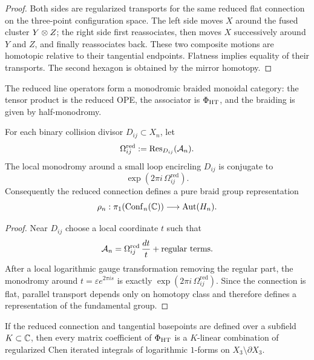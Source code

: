 \begin{proof}
Both sides are regularized transports for the same reduced flat connection on the three-point configuration space. The left side moves $X$ around the fused cluster $Y\otimes Z$; the right side first reassociates, then moves $X$ successively around $Y$ and $Z$, and finally reassociates back. These two composite motions are homotopic relative to their tangential endpoints. Flatness implies equality of their transports. The second hexagon is obtained by the mirror homotopy.
\end{proof}

\begin{corollary}\label{cor:braided-category}
The reduced line operators form a monodromic braided monoidal category: the tensor product is the reduced OPE, the associator is $\Phi_{\mathrm{HT}}$, and the braiding is given by half-monodromy.
\end{corollary}

\begin{theorem}\label{thm:pure-braid}
For each binary collision divisor $D_{ij}\subset X_n$, let
\[
 \Omega_{ij}^{\mathrm{red}}:=\mathrm{Res}_{D_{ij}}(\mathcal A_n).
\]
The local monodromy around a small loop encircling $D_{ij}$ is conjugate to
\[
 \exp(2\pi i\,\Omega_{ij}^{\mathrm{red}}).
\]
Consequently the reduced connection defines a pure braid group representation
\[
 \rho_n: \pi_1(\mathrm{Conf}_n(\mathbb C)) \longrightarrow \mathrm{Aut}(H_n).
\]
\end{theorem}

\begin{proof}
Near $D_{ij}$ choose a local coordinate $t$ such that
\[
 \mathcal A_n=\Omega_{ij}^{\mathrm{red}}\,\frac{dt}{t}+\text{regular terms}.
\]
After a local logarithmic gauge transformation removing the regular part, the monodromy around $t=\varepsilon e^{2\pi is}$ is exactly $\exp(2\pi i\,\Omega_{ij}^{\mathrm{red}})$. Since the connection is flat, parallel transport depends only on homotopy class and therefore defines a representation of the fundamental group.
\end{proof}

\begin{corollary}\label{cor:periods}
If the reduced connection and tangential basepoints are defined over a subfield $K\subset\mathbb C$, then every matrix coefficient of $\Phi_{\mathrm{HT}}$ is a $K$-linear combination of regularized Chen iterated integrals of logarithmic $1$-forms on $X_3\setminus\partial X_3$.
\end{corollary}

